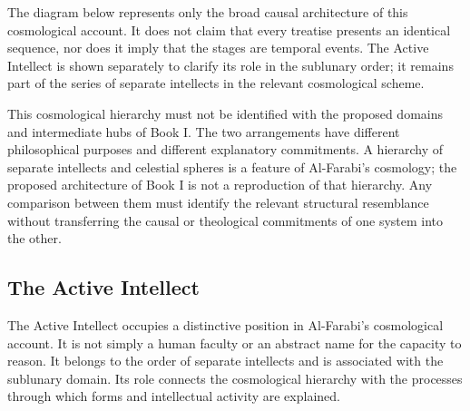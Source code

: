 \label{para:VS.B01.P01.C08.S12.SS09.P004}

The diagram below represents
only the broad causal architecture
of this cosmological account.
It does not claim that every
treatise presents an identical
sequence, nor does it imply
that the stages are temporal
events. The Active Intellect
is shown separately to clarify
its role in the sublunary order;
it remains part of the series
of separate intellects in the
relevant cosmological scheme.



\label{para:VS.B01.P01.C08.S12.SS09.P005}

This cosmological hierarchy
must not be identified with
the proposed domains and
intermediate hubs of Book I.
The two arrangements have
different philosophical purposes
and different explanatory
commitments. A hierarchy of
separate intellects and celestial
spheres is a feature of Al-Farabi's
cosmology; the proposed
architecture of Book I is not
a reproduction of that hierarchy.
Any comparison between them
must identify the relevant
structural resemblance without
transferring the causal or
theological commitments of
one system into the other.



\subsection{The Active Intellect}
\label{subsec:ch08-farabi-active-intellect}

\label{para:VS.B01.P01.C08.S12.SS10.P001}

The Active Intellect occupies
a distinctive position in
Al-Farabi's cosmological account.
It is not simply a human faculty
or an abstract name for the
capacity to reason. It belongs
to the order of separate
intellects and is associated
with the sublunary domain.
Its role connects the
cosmological hierarchy with
the processes through which
forms and intellectual activity
are explained.
\citep[sec.~4]{MennAlFarabiMetaphysicsSEP2026}

\label{para:VS.B01.P01.C08.S12.SS10.P002}

